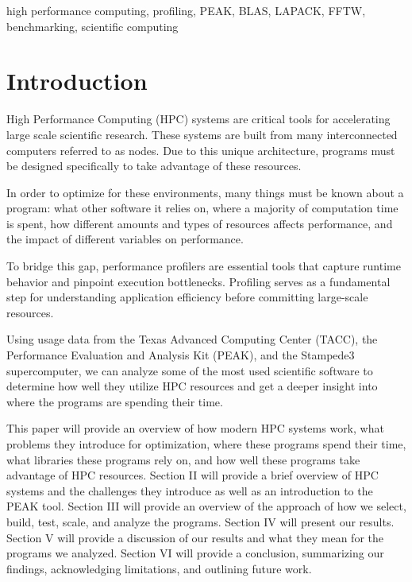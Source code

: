 \documentclass[conference]{IEEEtran}
\begin{document}
\begin{IEEEkeywords}
high performance computing, profiling, PEAK, BLAS, LAPACK, FFTW, benchmarking, scientific computing
\end{IEEEkeywords}

\section{Introduction}

High Performance Computing (HPC) systems are critical tools for accelerating large scale scientific research. These systems are built from many interconnected computers referred to as nodes. Due to this unique architecture, programs must be designed specifically to take advantage of these resources.

In order to optimize for these environments, many things must be known about a program: what other software it relies on, where a majority of computation time is spent, how different amounts and types of resources affects performance, and the impact of different variables on performance.

To bridge this gap, performance profilers are essential tools that capture runtime behavior and pinpoint execution bottlenecks. Profiling serves as a fundamental step for understanding application efficiency before committing large-scale resources.

Using usage data from the Texas Advanced Computing Center (TACC), the Performance Evaluation and Analysis Kit (PEAK), and the Stampede3 supercomputer, we can analyze some of the most used scientific software to determine how well they utilize HPC resources and get a deeper insight into where the programs are spending their time.

This paper will provide an overview of how modern HPC systems work, what problems they introduce for optimization, where these programs spend their time, what libraries these programs rely on, and how well these programs take advantage of HPC resources. Section II will provide a brief overview of HPC systems and the challenges they introduce as well as an introduction to the PEAK tool. Section III will provide an overview of the approach of how we select, build, test, scale, and analyze the programs. Section IV will present our results. Section V will provide a discussion of our results and what they mean for the programs we analyzed. Section VI will provide a conclusion, summarizing our findings, acknowledging limitations, and outlining future work.
\end{document}
